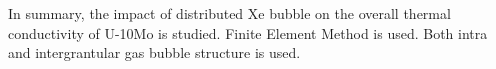\begin{doublespacing}
In summary, the impact of distributed Xe bubble on the overall thermal conductivity of U-10Mo is studied. Finite Element Method is used. Both intra and intergrantular gas bubble structure is used. 

\end{doublespacing}
